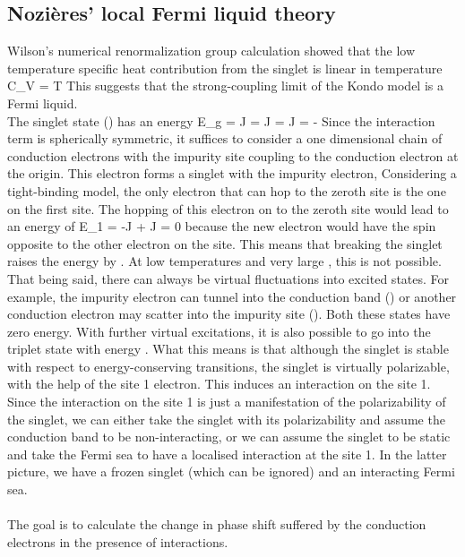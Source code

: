 \documentclass[14pt]{extarticle}
\numberwithin{equation}{section}
\begin{document}
\subsection{Nozières' local Fermi liquid theory}
Wilson's numerical renormalization group calculation showed that the low temperature specific heat contribution from the singlet is linear in temperature
\beq
C_V = \gamma T
\eeq
This suggests that the strong-coupling limit of the Kondo model is a Fermi liquid.\\
The singlet state () has an energy
\beq
E_g = J = J = J = -
\eeq
Since the interaction term is spherically symmetric, it suffices to consider a one dimensional chain of conduction electrons with the impurity site coupling to the conduction electron at the origin.
This electron forms a singlet with the impurity electron,
\beq
{}
\eeq
Considering a tight-binding model, the only electron that can hop to the zeroth site is the one on the first site.
The hopping of this electron on to the zeroth site would lead to an energy of
\beq
E_1 = -J + J = 0
\eeq
because the new electron would have the spin opposite to the other electron on the  site.
This means that breaking the singlet raises the energy by .
At low temperatures and very large , this is not possible.
That being said, there can always be virtual fluctuations into excited states.
For example, the impurity electron can tunnel into the conduction band () or another conduction electron may scatter into the impurity site ().
Both these states have zero energy.
With further virtual excitations, it is also possible to go into the triplet state with energy .
What this means is that although the singlet is stable with respect to energy-conserving transitions, the singlet is virtually polarizable, with the help of the site 1 electron.
This induces an interaction on the site 1.
Since the interaction on the site 1 is just a manifestation of the polarizability of the singlet, we can either take the singlet with its polarizability and assume the conduction band to be non-interacting, or we can assume the singlet to be static and take the Fermi sea to have a localised interaction at the site 1.
In the latter picture, we have a frozen singlet (which can be ignored) and an interacting Fermi sea.\\\\
The goal is to calculate the change in phase shift suffered by the conduction electrons in the presence of interactions.
\end{document}
